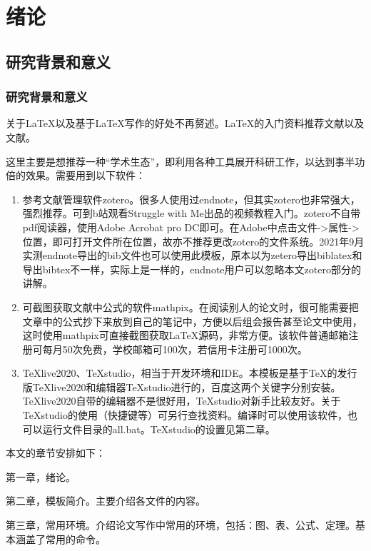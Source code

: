 \chapter{绪论}
%
\section{研究背景和意义}
\subsection{研究背景和意义}
%
关于\LaTeX{}以及基于\LaTeX{}写作的好处不再赘述。\LaTeX{}的入门资料推荐文献\parencite{_g}以及文献\parencite{_c}。

这里主要是想推荐一种“学术生态”，即利用各种工具展开科研工作，以达到事半功倍的效果。需要用到以下软件：
\begin{enumerate}
	\item 	参考文献管理软件zotero\cite{_m}。很多人使用过endnote，但其实zotero也非常强大，强烈推荐。可到b站观看Struggle with Me出品的视频教程\cite{_k}入门。zotero不自带pdf阅读器，使用Adobe Acrobat pro DC即可。在Adobe中点击文件->属性->位置，即可打开文件所在位置，故亦不推荐更改zotero的文件系统。2021年9月实测endnote导出的bib文件也可以使用此模板，原本以为zetero导出biblatex和导出bibtex不一样，实际上是一样的，endnote用户可以忽略本文zotero部分的讲解。
	\item	可截图获取文献中公式的软件mathpix\cite{_h}。在阅读别人的论文时，很可能需要把文章中的公式抄下来放到自己的笔记中，方便以后组会报告甚至论文中使用，这时使用mathpix可直接截图获取\LaTeX{}源码，非常方便。该软件普通邮箱注册可每月50次免费，学校邮箱可100次，若信用卡注册可1000次。	
	\item	TeXlive2020、TeXstudio，相当于开发环境和IDE。本模板是基于TeX的发行版TeXlive2020和编辑器TeXstudio进行的，百度这两个关键字分别安装。TeXlive2020自带的编辑器不是很好用，TeXstudio对新手比较友好。关于TeXstudio的使用（快捷键等）可另行查找资料。编译时可以使用该软件，也可以运行文件目录的all.bat。TeXstudio的设置见第二章。
\end{enumerate}

本文的章节安排如下：

第一章，绪论。

第二章，模板简介。主要介绍各文件的内容。

第三章，常用环境。介绍论文写作中常用的环境，包括：图、表、公式、定理。基本涵盖了常用的命令。



